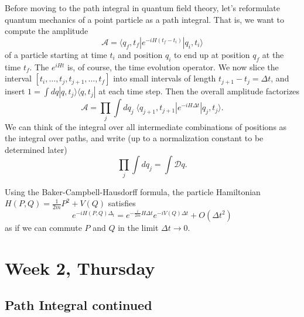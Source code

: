 \documentclass[12pt]{article}
\begin{document}
Before moving to the path integral in quantum field theory, let's
reformulate quantum mechanics of a point particle as a path
integral. That is, we want to compute the amplitude
\begin{equation}
  \mathcal{A} = 
  \langle q_f, t_f | e^{-i H (t_f-t_i)} | q_i, t_i \rangle
\end{equation}
of a particle starting at time $t_i$ and position $q_i$ to end up at
position $q_f$ at the time $t_f$. The $e^{iHt}$ is, of course, the
time evolution operator. We now slice the interval $[t_i, \dots, t_j,
t_{j+1}, \dots, t_f]$ into small intervals of length $t_{j+1}-t_j =
\Delta t$, and insert $1=\int dq |q, t_j\rangle \langle q, t_j|$ at
each time step. Then the overall amplitude factorizes
\begin{equation}
  \mathcal{A} = 
  \prod_j \int dq_j \;
  \langle q_{j+1}, t_{j+1} | e^{-i H \Delta t} | q_j, t_j \rangle.
\end{equation}
We can think of the integral over all intermediate combinations of
positions as the integral over paths, and write (up to a normalization
constant to be determined later) 
\begin{equation}
  \prod_j \int dq_j = \int \mathcal{D}q.
\end{equation}

Using the Baker-Campbell-Hausdorff formula, the particle Hamiltonian
$H(P, Q) = \tfrac{1}{2m} P^2 + V(Q)$ satisfies
\begin{equation}
  e^{-iH(P,Q)\Delta_t} =
  e^{-\frac{i}{2m}H \Delta t} e^{-iV(Q) \Delta t}
  + O(\Delta t^2)
\end{equation}
as if we can commute $P$ and $Q$ in the limit $\Delta t\to 0$.



\section{Week 2, Thursday}

\subsection{Path Integral continued}
\end{document}
